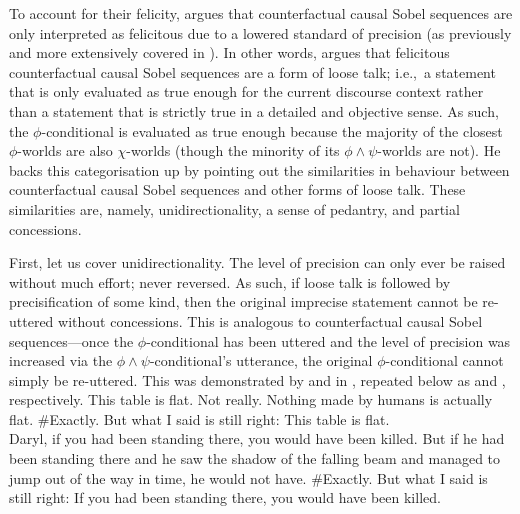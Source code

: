 \noindent To account for their felicity, \textcite{Klecha2014} argues that counterfactual causal Sobel sequences are only interpreted as felicitous due to a lowered standard of precision (as previously and more extensively covered in ). In other words, \textcite{Klecha2014} argues that felicitous counterfactual causal Sobel sequences are a form of loose talk; i.e.,~a statement that is only evaluated as true enough for the current discourse context rather than a statement that is strictly true in a detailed and objective sense. As such, the $\phi$-conditional is evaluated as true enough because the majority of the closest $\phi$-worlds are also $\chi$-worlds (though the minority of its $\phi\land\psi$-worlds are not). He backs this categorisation up by pointing out the similarities in behaviour between counterfactual causal Sobel sequences and other forms of loose talk. These similarities are, namely, unidirectionality, a sense of pedantry, and partial concessions.

First, let us cover unidirectionality. The level of precision can only ever be raised without much effort; never reversed. As such, if loose talk is followed by precisification of some kind, then the original imprecise statement cannot be re-uttered without concessions. This is analogous to counterfactual causal Sobel sequences---once the $\phi$-conditional has been uttered and the level of precision was increased via the $\phi\land\psi$-conditional's utterance, the original $\phi$-conditional cannot simply be re-uttered. This was demonstrated by  and  in , repeated below as  and , respectively.
\pex{}%
\a{}This table is flat.
\a{}Not really. Nothing made by humans is actually flat.
\a{}\#Exactly. But what I said is still right: This table is flat.\\
\emptyfill\parencite[adapted from][p.~113]{Klecha2014}
\xe
\pex{}%
			\a	{}Daryl, if you had been standing there, you would have been killed.
			\a	{}But if he had been standing there and he saw the shadow of the falling beam and managed to jump out of the way in time, he would not have.
			\a	{}\#Exactly. But what I said is still right:  If you had been
standing there, you would have been killed.\hfill\parencite[adapted from][p.~153f]{Klecha2014}
\xe

